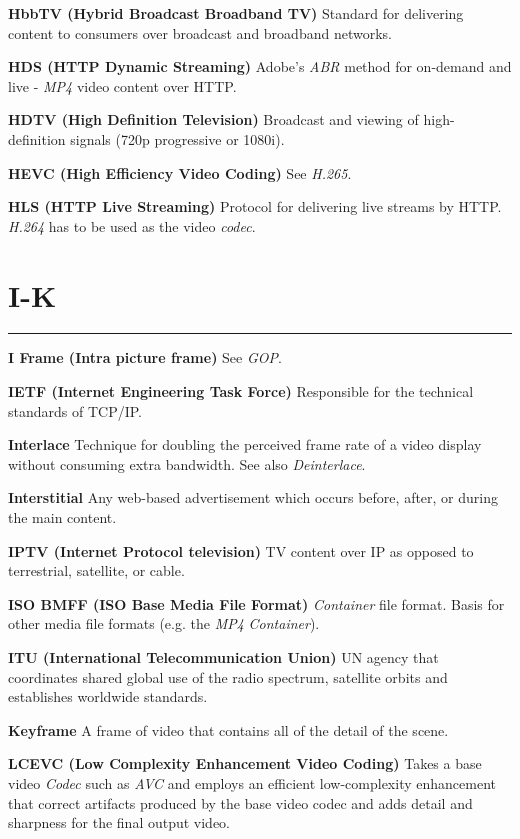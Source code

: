 \smallskip
\textbf{HbbTV (Hybrid Broadcast Broadband TV)}
Standard for delivering content to consumers over broadcast and broadband networks.

\smallskip
\textbf{HDS (HTTP Dynamic Streaming)}
Adobe's \textit{ABR} method for on-demand and live - \textit{MP4} video content over HTTP.

\smallskip
\textbf{HDTV (High Definition Television)}
Broadcast and viewing of high-definition signals (720p progressive or 1080i).

\smallskip
\textbf{HEVC (High Efficiency Video Coding)}
See \textit{H.265}.

\smallskip
\textbf{HLS (HTTP Live Streaming)}
Protocol for delivering live streams by HTTP.  \textit{H.264} has to be used as the video \textit{codec}.


\section{I-K}
\hrule

\medskip
\textbf{I Frame (Intra picture frame)}
See \textit{GOP}.

\smallskip
\textbf{IETF (Internet Engineering Task Force)}
Responsible for the technical standards of TCP/IP.

\smallskip
\textbf{Interlace}
Technique for doubling the perceived frame rate of a video display without consuming extra bandwidth. See also \textit{Deinterlace}.

\smallskip
\textbf{Interstitial}
Any web-based advertisement which occurs before, after, or during the main content.

\smallskip
\textbf{IPTV (Internet Protocol television)}
TV content over IP as opposed to terrestrial, satellite, or cable.

\smallskip
\textbf{ISO BMFF (ISO Base Media File Format)}
\textit{Container} file format.  Basis for other media file formats (e.g. the \textit{MP4} \textit{Container}).

\smallskip
\textbf{ITU (International Telecommunication Union)}
UN agency that coordinates shared global use of the radio spectrum, satellite orbits and establishes worldwide standards.

\smallskip
\textbf{Keyframe}
A frame of video that contains all of the detail of the scene.

\smallskip
\textbf{LCEVC (Low Complexity Enhancement Video Coding)}
Takes a base video \textit{Codec} such as \textit{AVC} and employs an efficient low-complexity enhancement that correct artifacts produced by the base video codec and adds detail and sharpness for the final output video.

